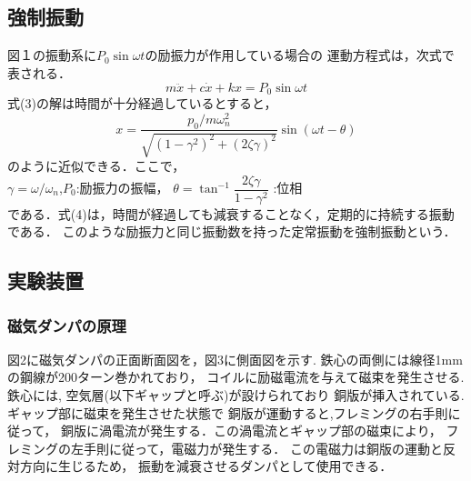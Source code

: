 \documentclass[a4paper,10.5pt]{jsarticle}
\begin{document}
\subsection{強制振動}
図１の振動系に$P_0\sin{\omega}{t}$の励振力が作用している場合の
運動方程式は，次式で表される．
\begin{equation}
  m\ddot{x}+c\dot{x}+kx = P_0\sin{\omega}{t}
\end{equation}
式(3)の解は時間が十分経過しているとすると，
\begin{equation}
  x = {\dfrac{p_0/m\omega_n^2}{\sqrt{(1-\gamma^2)^2+(2\zeta\gamma)^2}}\sin(\omega{t}-\theta)}
\end{equation}
のように近似できる．ここで，\\
\quad $\gamma=\omega/\omega_n$,$P_0$:励振力の振幅，
$\theta=\tan^{-1}{\dfrac{2\zeta\gamma}{1-\gamma^2}}$
:位相\\
である．式(4)は，時間が経過しても減衰することなく，定期的に持続する振動である．
このような励振力と同じ振動数を持った定常振動を強制振動という．

\subsection{実験装置}
\subsubsection{磁気ダンパの原理}
図2に磁気ダンパの正面断面図を，図3に側面図を示す. 
鉄心の両側には線径1mmの鋼線が200ターン巻かれており，
コイルに励磁電流を与えて磁束を発生させる. 
鉄心には, 空気層(以下ギャップと呼ぶ)が設けられており
銅版が挿入されている. ギャップ部に磁束を発生させた状態で
銅版が運動すると,フレミングの右手則に従って，
銅版に渦電流が発生する．この渦電流とギャップ部の磁束により，
フレミングの左手則に従って，電磁力が発生する．
この電磁力は銅版の運動と反対方向に生じるため，
振動を減衰させるダンパとして使用できる．
\end{document}
